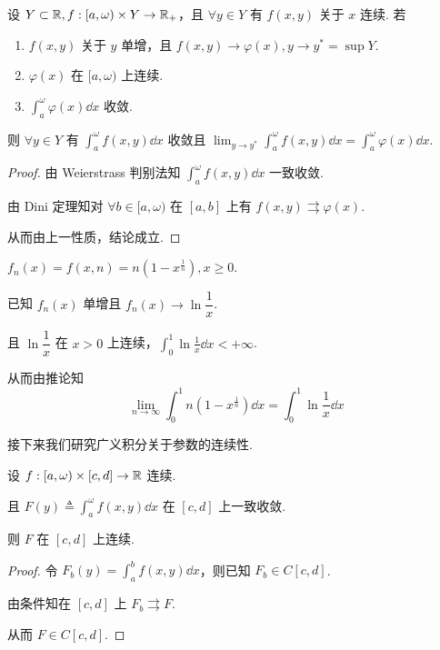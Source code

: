 \begin{inference}
    设 $Y\subset\mathbb{R},f:[a,\omega)\times Y\to\mathbb{R}_+$，且 $\forall y\in Y$ 有 $f(x,y)$ 关于 $x$ 连续. 若

    \begin{enumerate}
        \item $f(x,y)$ 关于 $y$ 单增，且 $f(x,y)\to\varphi(x),y\to y^*=\sup Y$.
            
        \item $\varphi(x)$ 在 $[a,\omega)$ 上连续.
            
        \item $\displaystyle\int_a^\omega\varphi(x)\dd x$ 收敛.
    \end{enumerate}

    则 $\forall y\in Y$ 有 $\displaystyle\int_a^\omega f(x,y)\dd x$ 收敛且 $\displaystyle\lim_{y\to y^*}\int_a^\omega f(x,y)\dd x=\int_a^\omega\varphi(x)\dd x$.
\end{inference}
\begin{proof}
    由 Weierstrass 判别法知 $\displaystyle\int_a^\omega f(x,y)\dd x$ 一致收敛.

    由 Dini 定理知对 $\forall b\in[a,\omega)$ 在 $[a,b]$ 上有 $f(x,y)\rightrightarrows\varphi(x)$.

    从而由上一性质，结论成立.
\end{proof}

\begin{example}
    $f_n(x)=f(x,n)=n(1-x^\frac{1}{n}),x\ge 0$.

    已知 $f_n(x)$ 单增且 $f_n(x)\to\ln\dfrac{1}{x}$.

    且 $\ln\dfrac{1}{x}$ 在 $x>0$ 上连续，$\displaystyle\int_0^1\ln\frac{1}{x}\dd x<+\infty$.

    从而由推论知
$$
\lim_{n\to\infty}\int_0^1n(1-x^\frac{1}{n})\dd x=\int_0^1\ln\frac{1}{x}\dd x
$$
\end{example}

接下来我们研究广义积分关于参数的连续性.

\begin{property}
    设 $f:[a,\omega)\times [c,d]\to\mathbb{R}$ 连续.

    且 $F(y)\triangleq\displaystyle\int_a^\omega f(x,y)\dd x$ 在 $[c,d]$ 上一致收敛.
    
    则 $F$ 在 $[c,d]$ 上连续.
\end{property}
\begin{proof}
    令 $F_b(y)=\displaystyle\int_a^b f(x,y)\dd x$，则已知 $F_b\in C[c,d]$.

    由条件知在 $[c,d]$ 上 $F_b\rightrightarrows F$.

    从而 $F\in C[c,d]$.
\end{proof}

